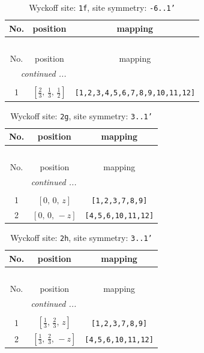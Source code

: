 \documentclass[fleqn,8pt]{jsarticle}
\begin{document}
\renewcommand{\arraystretch}{1.2}
\begin{longtable}{ccc}
\caption{Wyckoff site: {\tt 1f}, site symmetry: {\tt -6..1'}}
 \\
 \hline \hline
No. & position & mapping \\ \hline \endfirsthead

\multicolumn{2}{l}{\tablename\ \thetable{}} \\
 \hline \hline
No. & position & mapping \\ \hline \endhead

 \hline \hline
\multicolumn{2}{r}{\footnotesize\it continued ...} \\ \endfoot

 \hline \hline
\multicolumn{2}{r}{} \\ \endlastfoot

1 & $\left[ \frac{2}{3},\, \frac{1}{3},\, \frac{1}{2} \right]$ & {\tt [1,2,3,4,5,6,7,8,9,10,11,12]} \\
\end{longtable}
\renewcommand{\arraystretch}{1.2}
\begin{longtable}{ccc}
\caption{Wyckoff site: {\tt 2g}, site symmetry: {\tt 3..1'}}
 \\
 \hline \hline
No. & position & mapping \\ \hline \endfirsthead

\multicolumn{2}{l}{\tablename\ \thetable{}} \\
 \hline \hline
No. & position & mapping \\ \hline \endhead

 \hline \hline
\multicolumn{2}{r}{\footnotesize\it continued ...} \\ \endfoot

 \hline \hline
\multicolumn{2}{r}{} \\ \endlastfoot

1 & $\left[ 0,\, 0,\, z \right]$ & {\tt [1,2,3,7,8,9]} \\ \hline
2 & $\left[ 0,\, 0,\, - z \right]$ & {\tt [4,5,6,10,11,12]} \\
\end{longtable}
\renewcommand{\arraystretch}{1.2}
\begin{longtable}{ccc}
\caption{Wyckoff site: {\tt 2h}, site symmetry: {\tt 3..1'}}
 \\
 \hline \hline
No. & position & mapping \\ \hline \endfirsthead

\multicolumn{2}{l}{\tablename\ \thetable{}} \\
 \hline \hline
No. & position & mapping \\ \hline \endhead

 \hline \hline
\multicolumn{2}{r}{\footnotesize\it continued ...} \\ \endfoot

 \hline \hline
\multicolumn{2}{r}{} \\ \endlastfoot

1 & $\left[ \frac{1}{3},\, \frac{2}{3},\, z \right]$ & {\tt [1,2,3,7,8,9]} \\ \hline
2 & $\left[ \frac{1}{3},\, \frac{2}{3},\, - z \right]$ & {\tt [4,5,6,10,11,12]} \\
\end{longtable}
\end{document}
